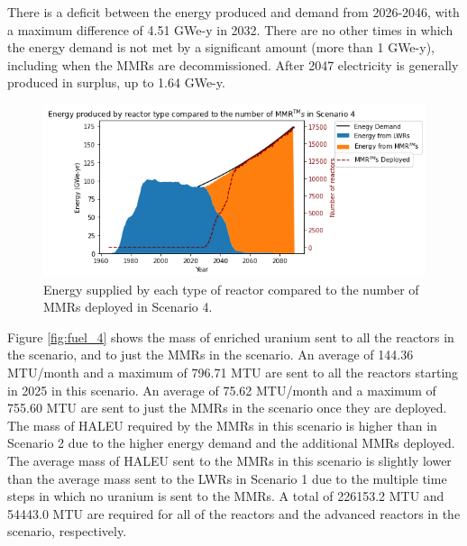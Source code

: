 There is a deficit between the energy produced and  
demand from 2026-2046, with a maximum difference of 4.51 GWe-y in 2032.
There are no other times in which the energy demand is not met by a 
significant amount (more than 1 GWe-y), including when the \glspl{MMR} are 
decommissioned. After 2047 electricity is generally produced in surplus, 
up to 1.64 GWe-y. 

\begin{figure}
    \centering 
    \includegraphics[width=\textwidth]{../figures/energy_scenario4.png}
    \caption{Energy supplied by each type of reactor compared to the number of 
    \glspl{MMR} deployed in Scenario 4.}
    \label{fig:energy_rx_4}
\end{figure}

Figure \ref{fig:fuel_4} shows the mass of enriched uranium sent to all the 
reactors in the scenario, and to just the \glspl{MMR} 
in the scenario. An average of 144.36 MTU/month and a maximum of 796.71 MTU
are sent to all the reactors starting in 2025 in this scenario. An average of 
75.62 MTU/month and a maximum of 755.60 MTU are sent to just the \glspl{MMR}
in the scenario once they are deployed. The mass of \gls{HALEU}
required by the \glspl{MMR} in this scenario is higher than  
in Scenario 2 due to the higher energy 
demand and the additional \glspl{MMR} deployed. The 
average mass of \gls{HALEU} sent to the \glspl{MMR} in this scenario is 
slightly lower than the average mass sent to the \glspl{LWR} in Scenario 1 
due to the multiple time steps in which no uranium is sent to the \glspl{MMR}.
A total of 226153.2 MTU and 54443.0 MTU are required for all of the 
reactors and the advanced reactors in the scenario, respectively. 


